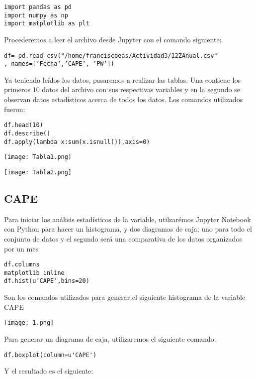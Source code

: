 \documentclass[12pt,letterpaper]{article}
\begin{document}
\begin{portada}
\begin{verbatim}
import pandas as pd
import numpy as np
import matplotlib as plt
\end{verbatim}

Procederemos a leer el archivo desde Jupyter con el comando siguiente:

\begin{verbatim}
df= pd.read_csv("/home/franciscoeas/Actividad3/12ZAnual.csv"
, names=[’Fecha’,’CAPE’, ’PW’])
\end{verbatim}

Ya teniendo leídos los datos, pasaremos a realizar las tablas. Una contiene los primeros 10 datos del archivo con sus respectivas variables y en la segundo se observan datos estadísticos acerca de todos los datos. Los comandos utilizados fueron: 

\begin{verbatim}
df.head(10)
df.describe()
df.apply(lambda x:sum(x.isnull()),axis=0)
\end{verbatim}
\begin{center}
\texttt{[image: Tabla1.png]}
\vspace{0.5cm}

\texttt{[image: Tabla2.png]}
\end{center}
\subsection{CAPE}
Para iniciar los análisis estadísticos de la variable, utilzarémos Jupyter Notebook con Python para hacer un histograma, y dos diagramas de caja; uno para todo el conjunto de datos y el segundo será una comparativa de los datos organizados por un mes

\begin{verbatim}
df.columns
matplotlib inline
df.hist(u’CAPE’,bins=20)
\end{verbatim}

Son los comandos utilizados para generar el siguiente histograma de la variable CAPE
\begin{center}
\texttt{[image: 1.png]}
\end{center}
\newpage
Para generar un diagrama de caja, utilizaremos el siguiente comando:
\begin{verbatim}
df.boxplot(column=u'CAPE')
\end{verbatim}


Y el resultado es el siguiente:


\end{portada}
\end{document}
